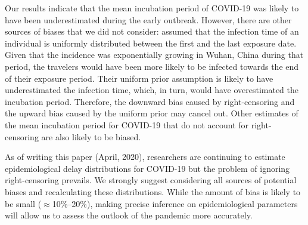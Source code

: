 \documentclass[12pt]{article}
\begin{document}
Our results indicate that the mean incubation period of COVID-19 was likely to have been underestimated during the early outbreak.
However, there are other sources of biases that we did not consider:
\cite{backer2020incubation} assumed that the infection time of an individual is uniformly distributed between the first and the last exposure date.
Given that the incidence was exponentially growing in Wuhan, China during that period, the travelers would have been more likely to be infected towards the end of their exposure period.
Their uniform prior assumption is likely to have underestimated the infection time, which, in turn, would have overestimated the incubation period.
Therefore, the downward bias caused by right-censoring and the upward bias caused by the uniform prior may cancel out.
Other estimates of the mean incubation period for COVID-19 that do not account for right-censoring are also likely to be biased.

As of writing this paper (April, 2020), researchers are continuing to estimate epidemiological delay distributions for COVID-19 but the problem of ignoring right-censoring prevails.
We strongly suggest considering all sources of potential biases and recalculating these distributions.
While the amount of bias is likely to be small ($\approx$10\%--20\%), making precise inference on epidemiological parameters will allow us to assess the outlook of the pandemic more accurately.


\end{document}
